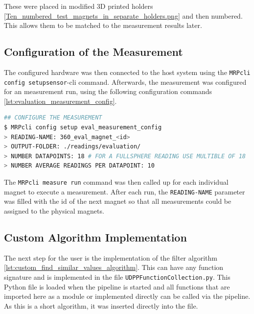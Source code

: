 These were placed in modified 3D printed holders
\ref{Ten_numbered_test_magnets_in_separate_holders.png} and then
numbered. This allows them to be matched to the measurement results
later.

\hypertarget{configuration-of-the-measurement}{%
\subsection{Configuration of the
Measurement}\label{configuration-of-the-measurement}}

The configured hardware was then connected to the host system using the
\passthrough{\lstinline!MRPcli config setupsensor!}-\gls{cli} command.
Afterwards, the measurement was configured for an measurement run, using
the following configuration commands
\ref{lst:evaluation_measurement_config}.

\newpage

\begin{lstlisting}[language=bash, caption={Measurement configuration for evaluation measurement}, label=lst:evaluation_measurement_config]
## CONFIGURE THE MEASUREMENT
$ MRPcli config setup eval_measurement_config
> READING-NAME: 360_eval_magnet_<id>
> OUTPUT-FOLDER: ./readings/evaluation/ 
> NUMBER DATAPOINTS: 18 # FOR A FULLSPHERE READING USE MULTIBLE OF 18
> NUMBER AVERAGE READINGS PER DATAPOINT: 10
\end{lstlisting}

The \passthrough{\lstinline!MRPcli measure run!} command was then called
up for each individual magnet to execute a measurement. After each run,
the \passthrough{\lstinline!READING-NAME!} parameter was filled with the
id of the next magnet so that all measurements could be assigned to the
physical magnets.

\hypertarget{custom-algorithm-implementation}{%
\subsection{Custom Algorithm
Implementation}\label{custom-algorithm-implementation}}

The next step for the user is the implementation of the filter algorithm
\ref{lst:custom_find_similar_values_algorithm}. This can have any
function signature and is implemented in the file
\passthrough{\lstinline!UDPPFunctionCollection.py!}. This Python file is
loaded when the pipeline is started and all functions that are imported
here as a module or implemented directly can be called via the pipeline.
As this is a short algorithm, it was inserted directly into the file.

